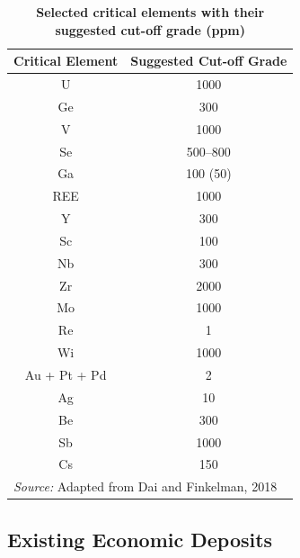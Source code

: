 \documentclass[11pt,a4paper,]{article}
\begin{document}
\begin{table}
\centering
\caption{\label{tab:cutoff-grade}\textbf{Selected critical elements with their suggested cut-off grade (ppm)}}
\centering
\begin{tabular}[t]{cc}
\toprule
Critical Element & Suggested Cut-off Grade\\
\midrule
U & 1000\\
Ge & 300\\
V & 1000\\
Se & 500–800\\
Ga & 100 (50)\\
\addlinespace
REE & 1000\\
Y & 300\\
Sc & 100\\
Nb & 300\\
Zr & 2000\\
\addlinespace
Mo & 1000\\
Re & 1\\
Wi & 1000\\
Au + Pt + Pd & 2\\
Ag & 10\\
\addlinespace
Be & 300\\
Sb & 1000\\
Cs & 150\\
\bottomrule
\multicolumn{2}{l}{\rule{0pt}{1em}\textit{Source: } Adapted from Dai and Finkelman, 2018}\\
\end{tabular}
\end{table}

\hypertarget{existing-economic-deposits}{%
\subsection{Existing Economic Deposits}\label{existing-economic-deposits}}
\end{document}
